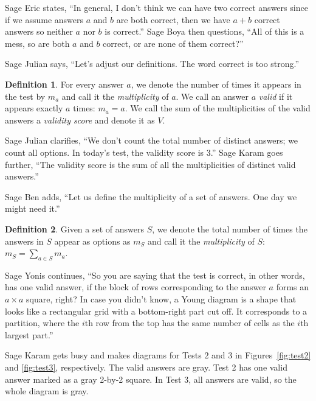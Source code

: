 \documentclass[12pt,reqno]{article}
\theoremstyle{plain}
\theoremstyle{definition}
\newtheorem{definition}{Definition}
\theoremstyle{remark}
\begin{document}
Sage Eric states, ``In general, I don't think we can have two correct answers since if we assume answers $a$ and $b$ are both correct, then we have $a+b$ correct answers so neither $a$ nor $b$ is correct.'' Sage Boya then questions, ``All of this is a mess, so are both $a$ and $b$ correct, or are none of them correct?''

Sage Julian says, ``Let's adjust our definitions. The word correct is too strong.''

\begin{definition}
    For every answer $a$, we denote the number of times it appears in the test by $m_a$ and call it the \textit{multiplicity} of $a$. We call an answer $a$ \textit{valid} if it appears exactly $a$ times: $m_a = a$. We call the sum of the multiplicities of the valid answers a \textit{validity score} and denote it as $V$.
\end{definition}

Sage Julian clarifies, ``We don't count the total number of distinct answers; we count all options. In today's test, the validity score is $3$.'' Sage Karam goes further, ``The validity score is the sum of all the multiplicities of distinct valid answers.''

Sage Ben adds, ``Let us define the multiplicity of a set of answers. One day we might need it.''

\begin{definition}
    Given a set of answers $S$, we denote the total number of times the answers in $S$ appear as options as $m_S$ and call it the \textit{multiplicity} of $S$: $m_S=\sum_{a\in S} m_a$.
\end{definition}

Sage Yonis continues, ``So you are saying that the test is correct, in other words, has one valid answer, if the block of rows corresponding to the answer $a$ forms an $a \times a$ square, right? In case you didn't know, a Young diagram is a shape that looks like a rectangular grid with a bottom-right part cut off. It corresponds to a partition, where the $i$th row from the top has the same number of cells as the $i$th largest part.''

Sage Karam gets busy and makes diagrams for Tests $2$ and $3$ in Figures~\ref{fig:test2} and \ref{fig:test3}, respectively. The valid answers are gray. Test 2 has one valid answer marked as a gray 2-by-2 square. In Test 3, all answers are valid, so the whole diagram is gray.
\end{document}
